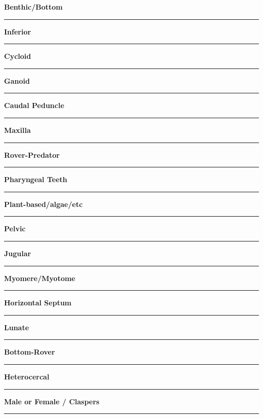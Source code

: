 \documentclass[11pt]{exam}
\newcommand*\Matching[1]{
\ifprintanswers
	\textbf{#1}
\else
	\rule{2.1in}{0.4pt}
\fi
}
\newlength\matchlena
\newlength\matchlenb
\newcommand\MatchQuestion[2]{%
	\setlength\matchlenb{\linewidth}
	\addtolength\matchlenb{-\matchlena}
	\parbox[t]{\matchlena}{\Matching{#1}}\enspace\parbox[t]{\matchlenb}{#2}}
\begin{document}
\begin{questions}
\begin{multicols}{2}
\question\MatchQuestion{Benthic/Bottom}{}
\vspace{2\baselineskip}

\question\MatchQuestion{Inferior}{}
\vspace{2\baselineskip}

\question\MatchQuestion{Cycloid}{}
\vspace{2\baselineskip}

\question[\textsc{ec}]\MatchQuestion{Ganoid}{}
\vspace{2\baselineskip}

\question\MatchQuestion{Caudal Peduncle}{}
\vspace{2\baselineskip}

\question\MatchQuestion{Maxilla}{}
\vspace{2\baselineskip}

\question\MatchQuestion{Rover-Predator}{}
\vspace{2\baselineskip}

\question\MatchQuestion{Pharyngeal Teeth}{}
\vspace{2\baselineskip}

\question[\textsc{ec}]\MatchQuestion{Plant-based/algae/etc}{}
\vspace{2\baselineskip}


\question\MatchQuestion{Pelvic}{}
\vspace{2\baselineskip}

\question\MatchQuestion{Jugular}{}
\vspace{2\baselineskip}



\question\MatchQuestion{Myomere/Myotome}{}
\vspace{2\baselineskip}

\question\MatchQuestion{Horizontal Septum}{}
\vspace{2\baselineskip}

\question\MatchQuestion{Lunate}{}
\vspace{2\baselineskip}

\question\MatchQuestion{Bottom-Rover}{}
\vspace{2\baselineskip}


\question\MatchQuestion{Heterocercal}{}
\vspace{2\baselineskip}
%
\question\MatchQuestion{Male or Female / Claspers}{}
\vspace{2\baselineskip}


\end{multicols}
\end{questions}
\end{document}
